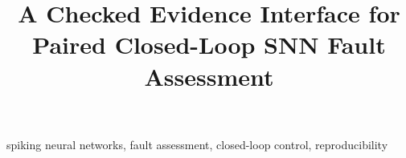 \documentclass[conference]{IEEEtran}
\begin{document}
\title{A Checked Evidence Interface for Paired Closed-Loop SNN Fault Assessment}
\author{
}
\maketitle
{}
\begin{abstract}

\end{abstract}
\begin{IEEEkeywords}
spiking neural networks, fault assessment, closed-loop control, reproducibility
\end{IEEEkeywords}


\SystemFigure

\ReuseFigure
\TransferFigure



\FloatBarrier\clearpage


\end{document}
